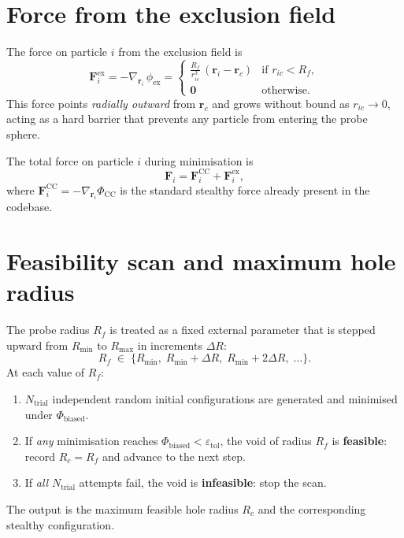 \documentclass[11pt]{article}
\begin{document}
\section{Force from the exclusion field}

The force on particle $i$ from the exclusion field is
\begin{equation}
    \mathbf{F}_i^{\mathrm{ex}}
    = -\nabla_{\mathbf{r}_i}\,\phi_{\mathrm{ex}}
    = \begin{cases}
        \displaystyle
        \frac{R_f}{r_{ic}^{3}}\,(\mathbf{r}_i - \mathbf{r}_c)
        & \text{if } r_{ic} < R_f,\\[8pt]
        \mathbf{0} & \text{otherwise.}
      \end{cases}
    \label{eq:force}
\end{equation}
This force points \emph{radially outward} from $\mathbf{r}_c$ and grows
without bound as $r_{ic}\to 0$, acting as a hard barrier that prevents
any particle from entering the probe sphere.

The total force on particle $i$ during minimisation is
\begin{equation}
    \mathbf{F}_i
    = \mathbf{F}_i^{\mathrm{CC}} + \mathbf{F}_i^{\mathrm{ex}},
\end{equation}
where $\mathbf{F}_i^{\mathrm{CC}} = -\nabla_{\mathbf{r}_i}\Phi_{\mathrm{CC}}$
is the standard stealthy force already present in the codebase.

\section{Feasibility scan and maximum hole radius}

The probe radius $R_f$ is treated as a fixed external parameter that is
stepped upward from $R_{\min}$ to $R_{\max}$ in increments $\Delta R$:
\begin{equation}
    R_f \;\in\; \{R_{\min},\; R_{\min}+\Delta R,\; R_{\min}+2\Delta R,\;\ldots\}.
\end{equation}
At each value of $R_f$:
\begin{enumerate}
    \item $N_{\mathrm{trial}}$ independent random initial configurations
          are generated and minimised under $\Phi_{\mathrm{biased}}$.
    \item If \emph{any} minimisation reaches
          $\Phi_{\mathrm{biased}} < \varepsilon_{\mathrm{tol}}$,
          the void of radius $R_f$ is \textbf{feasible}: record
          $R_c = R_f$ and advance to the next step.
    \item If \emph{all} $N_{\mathrm{trial}}$ attempts fail, the void is
          \textbf{infeasible}: stop the scan.
\end{enumerate}
The output is the maximum feasible hole radius $R_c$ and the
corresponding stealthy configuration.
\end{document}
